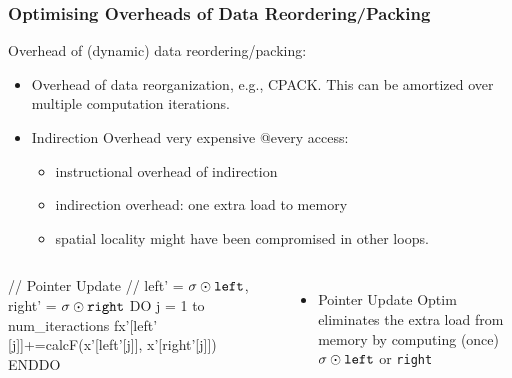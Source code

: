 \documentclass{beamer}
\newcommand{\emp}[1]{\textcolor{DikuRed}{ #1}}
\newcommand{\mymath}[1]{$ #1 $}
\begin{document}
\begin{frame}[fragile,t]
  \frametitle{Optimising Overheads of Data Reordering/Packing}

Overhead of (dynamic) data reordering/packing:
\begin{itemize}
    \item Overhead of data reorganization, e.g., CPACK. 
            This can be amortized over multiple computation 
            iterations.\medskip
    \item Indirection Overhead very expensive @every access:
            \begin{itemize}
                \item instructional overhead of indirection
                \item indirection overhead: one extra load to memory
                \item spatial locality might have been compromised 
                        in other loops. 
            \end{itemize}
\end  {itemize}

\begin{columns}
\begin{colorcode}
// Pointer Update
// left' = \mymath{\sigma\odot{\tt{}left}}, right' = \mymath{\sigma\odot{\tt{}right}}
DO j = 1 to num_iteractions
  fx'[left' [j]]+=calcF(x'[left'[j]], 
                        x'[right'[j]])
ENDDO
\end{colorcode}
\begin{itemize}
    \item \emp{Pointer Update Optim} eliminates the extra 
            load from memory by computing (once) 
            \mymath{\sigma \odot {\tt left}} or {\tt right}
\end  {itemize} 
\end{columns}

\end{frame}
\end{document}
